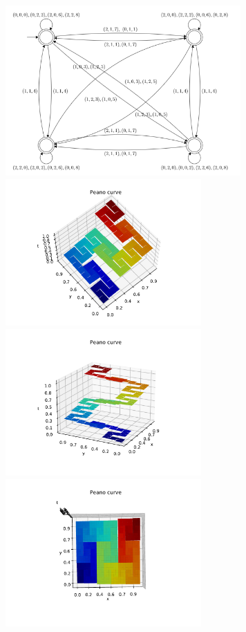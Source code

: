 \documentclass[landscape,usenames,dvipsnames]{sciposter}
\begin{document}
\begin{multicols}{3}
\begin{center}
    \includegraphics[width=9cm]{FA20/images/fractals/peano-automata.png}
    \includegraphics[width=7.5cm]{FA20/images/fractals/peano-1.pdf}
    \includegraphics[width=7.5cm]{FA20/images/fractals/peano-2.pdf}
    \includegraphics[width=7.5cm]{FA20/images/fractals/peano-3.pdf} \\
\end{center}    
    

\end{multicols}
\end{document}
